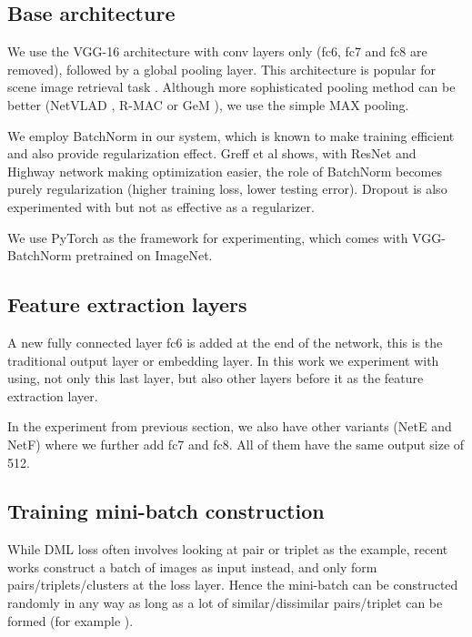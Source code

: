 \documentclass[10pt,twocolumn,letterpaper]{article}
\begin{document}
\subsection{Base architecture}

We use the VGG-16 architecture with conv layers only (fc6, fc7 and fc8 are removed), followed by a global pooling layer. This architecture is popular for scene image retrieval task \cite{arandjelovic2016netvlad,tolias2015particular,radenovic2016cnn,gordo2016deep}. Although more sophisticated pooling method can be better (NetVLAD \cite{arandjelovic2016netvlad}, R-MAC \cite{tolias2015particular} or GeM \cite{radenovic2017fine}), we use the simple MAX pooling.

We employ BatchNorm \cite{ioffe2015batch} in our system, which is known to make training efficient and also provide regularization effect. Greff  et al \cite{greff2016highway} shows, with ResNet and Highway network making optimization easier, the role of BatchNorm becomes purely regularization (higher training loss, lower testing error). Dropout is also experimented with but not as effective as a regularizer.

We use PyTorch as the framework for experimenting, which comes with VGG-BatchNorm pretrained on ImageNet.

\subsection{Feature extraction layers}

A new fully connected layer fc6 is added at the end of the network, this is the traditional output layer or embedding layer. In this work we experiment with using, not only this last layer, but also other layers before it as the feature extraction layer.

In the experiment from previous section, we also have other variants (NetE and NetF) where we further add fc7 and fc8. All of them have the same output size of 512.

\subsection{Training mini-batch construction}


While DML loss often involves looking at pair or triplet as the example, recent works construct a batch of images as input instead, and only form pairs/triplets/clusters at the loss layer. Hence the mini-batch can be constructed randomly in any way as long as a lot of similar/dissimilar pairs/triplet can be formed (for example \cite{vo2016localizing, sohn2016improved}).
\end{document}
